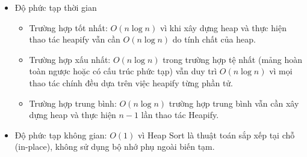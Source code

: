 \begin{itemize}
    \item Độ phức tạp thời gian \cite[p.~102]{hoang2008}
    \begin{itemize}[label=$\circ$]
        \item Trường hợp tốt nhất: $O(n\log{n})$ vì khi xây dựng heap 
        và thực hiện thao tác heapify vẫn cần $O(n \log n)$ do tính 
        chất của heap.
        \item Trường hợp xấu nhất: $O(n\log{n})$ trong trường hợp tệ 
        nhất (mảng hoàn toàn ngược hoặc có cấu trúc phức tạp) vẫn duy 
        trì $O(n \log n)$ vì mọi thao tác chính đều dựa trên việc 
        heapify từng phần tử.
        \item Trường hợp trung bình: $O(n\log{n})$ trường hợp trung bình 
        vẫn cần xây dựng heap và thực hiện $n-1$ lần thao tác Heapify.
    \end{itemize}
    \item Độ phức tạp không gian: $O(1)$ vì Heap Sort là thuật toán 
    sắp xếp tại chỗ (in-place), không sử dụng bộ nhớ phụ ngoài biến tạm.
\end{itemize}
